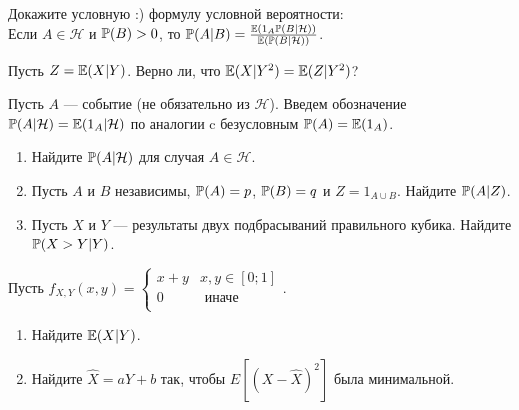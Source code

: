 \begin{problem}
Докажите условную :) формулу условной вероятности: \\
Если $A\in \mathcal{H}$ и $\P(B)>0$, то
$\P(A|B)=\frac{\E(1_{A}\P(B|\mathcal{H}))}{\E(\P(B|\mathcal{H}))}$.

\begin{sol}

\end{sol}
\end{problem}

\begin{problem}
Пусть $Z=\E(X|Y)$. Верно ли, что $\E(X|Y^{2})=\E(Z|Y^{2})$?

\begin{sol}

\end{sol}
\end{problem}

\begin{problem}
Пусть $A$ — событие (не обязательно из $\mathcal{H}$). Введем
обозначение $\P(A|\mathcal{H})=\E(1_A|\mathcal{H})$ по аналогии
c безусловным $\P(A)=\E(1_{A})$.
\begin{enumerate}
\item Найдите $\P(A|\mathcal{H})$ для случая $A\in\mathcal{H}$.
\item Пусть $A$ и $B$ независимы, $\P(A)=p$, $\P(B)=q$ и $Z=1_{A\cup B}$. Найдите $\P(A|Z)$.
\item Пусть $X$ и $Y$ — результаты двух подбрасываний правильного
кубика. Найдите $\P(X>Y|Y)$.
\end{enumerate}

\begin{sol}

\end{sol}
\end{problem}

\begin{problem}
Пусть $f_{X,Y}(x,y)=
\begin{cases}
  x+y & x,y \in [0;1] \\
  0 & \text{ иначе } \\
\end{cases}$.
\begin{enumerate}
\item Найдите $\E(X|Y)$.
\item Найдите $\hat{X}=aY+b$ так, чтобы $E[(X-\hat{X})^{2}]$ была
минимальной.
\end{enumerate}

\begin{sol}

\end{sol}
\end{problem}

